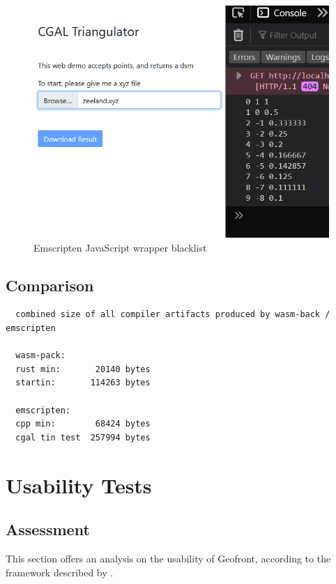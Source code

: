 \begin{figure}
  \graphicspath{{../../assets/images/6.1.4/}}
  \centering
  \includegraphics[width=0.50\linewidth]{demo-3.PNG}
  \caption[loading a plugin]{Emscripten JavaScript wrapper blacklist }
  \label{fig:cgal-tryout-3}
\end{figure}

\subsection{Comparison}

\begin{lstlisting}
  combined size of all compiler artifacts produced by wasm-back / emscripten

  wasm-pack:
  rust min:       20140 bytes
  startin:       114263 bytes

  emscripten:
  cpp min:        68424 bytes
  cgal tin test  257994 bytes

\end{lstlisting}

\section{Usability Tests}
\label{sec:testing:usability}




\subsection{Assessment}

This section offers an analysis on the usability of Geofront, according to the framework described by \cite[]{green_usability_1996}.

